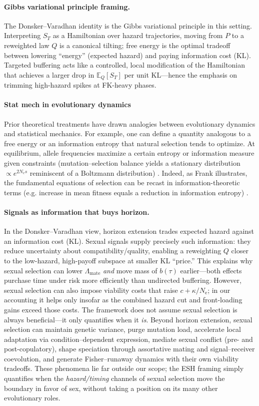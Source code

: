 \documentclass[11pt]{article}
\theoremstyle{upright}
\newcommand{\Ne}{N_{\mathrm{e}}}
\begin{document}
\paragraph{Gibbs variational principle framing.}
The Donsker–Varadhan identity is the Gibbs variational principle in this setting.
Interpreting $S_T$ as a Hamiltonian over hazard trajectories, moving from $P$ to a reweighted law $Q$ is a canonical tilting;
free energy is the optimal tradeoff between lowering ``energy'' (expected hazard) and paying information
cost (KL). Targeted buffering acts like a controlled, local modification of the Hamiltonian that achieves a larger drop in
$\mathbb E_Q[S_T]$ per unit KL—hence the emphasis on trimming high-hazard spikes at FK-heavy phases.

\paragraph{Stat mech in evolutionary dynamics}
Prior theoretical treatments have drawn analogies between evolutionary dynamics and statistical mechanics. For example, one can define a quantity analogous to a free energy or an information entropy that natural selection tends to optimize. At equilibrium, allele frequencies maximize a certain entropy or information measure given constraints (mutation–selection balance yields a stationary distribution $\propto e^{2N_es}$ reminiscent of a Boltzmann distribution) \citep{Sella2005}. Indeed, as Frank illustrates, the fundamental equations of selection can be recast in information-theoretic terms (e.g. increase in mean fitness equals a reduction in information entropy) \citep{Frank2012}.

\paragraph{Signals as information that buys horizon.}
In the Donsker--Varadhan view, horizon extension trades expected hazard against an information cost (KL). Sexual 
signals supply precisely such information: they reduce uncertainty about compatibility/quality, enabling a 
reweighting $Q$ closer to the low-hazard, high-payoff subspace at smaller KL “price.” This explains why sexual 
selection can lower $\Lambda_{\mathrm{mate}}$ \emph{and} move mass of $b(\tau)$ earlier—both effects purchase 
time under risk more efficiently than undirected buffering. However, sexual selection can also impose viability costs 
that raise $c+\kappa/\Ne$; in our accounting it helps only insofar as the combined hazard cut and front-loading 
gains exceed those costs. The framework does not assume sexual selection is always beneficial—it only quantifies 
when it \emph{is}. Beyond horizon extension, sexual selection can maintain genetic variance, purge mutation load, 
accelerate local adaptation via condition–dependent expression, mediate sexual conflict (pre- and post-copulatory), 
shape speciation through assortative mating and signal–receiver coevolution, and generate Fisher–runaway dynamics 
with their own viability tradeoffs. These phenomena lie far outside our scope; the ESH framing simply quantifies 
when the \emph{hazard/timing} channels of sexual selection move the boundary in favor of sex, without taking 
a position on its many other evolutionary roles.
\end{document}
